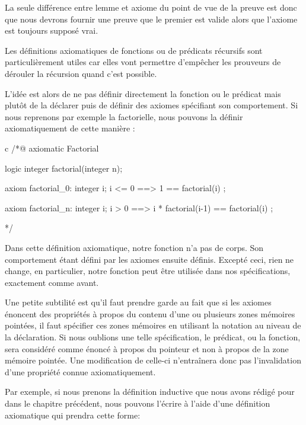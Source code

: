 La seule différence entre lemme et axiome du point de vue de la preuve est donc
que nous devrons fournir une preuve que le premier est valide alors que l'axiome
est toujours supposé vrai.





Les définitions axiomatiques de fonctions ou de prédicats récursifs sont
particulièrement utiles car elles vont permettre d'empêcher les prouveurs de
dérouler la récursion quand c'est possible.



L'idée est alors de ne pas définir directement la fonction ou le prédicat mais
plutôt de la déclarer puis de définir des axiomes spécifiant son comportement.
Si nous reprenons par exemple la factorielle, nous pouvons la définir
axiomatiquement de cette manière :



\begin{CodeBlock}{c}
/*@
  axiomatic Factorial{
    logic integer factorial(integer n);

    axiom factorial_0:
      \forall integer i; i <= 0 ==> 1 == factorial(i) ;

    axiom factorial_n:
      \forall integer i; i > 0 ==> i * factorial(i-1) == factorial(i) ;
  }
*/
\end{CodeBlock}



Dans cette définition axiomatique, notre fonction n'a pas de corps. Son
comportement étant défini par les axiomes ensuite définis. Excepté ceci,
rien ne change, en particulier, notre fonction peut être utilisée dans nos
spécifications, exactement comme avant.


Une petite subtilité
est qu'il faut prendre garde au fait que si les axiomes énoncent des propriétés
à propos du contenu d'une ou plusieurs zones mémoires pointées, il faut
spécifier ces zones mémoires en utilisant la notation  au niveau de
la déclaration. Si nous oublions une telle spécification, le prédicat, ou la
fonction, sera considéré comme énoncé à propos du pointeur et non à propos de la
zone mémoire pointée. Une modification de celle-ci n'entraînera donc pas
l'invalidation d'une propriété connue axiomatiquement.


Par exemple, si nous prenons la définition inductive que nous avons rédigé pour
 dans le chapitre précédent, nous pouvons l'écrire à l'aide
d'une définition axiomatique qui prendra cette forme:




